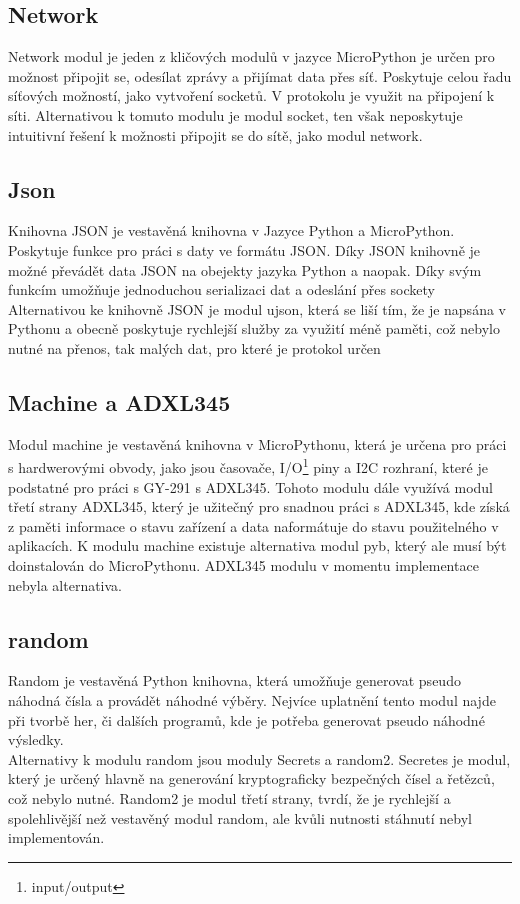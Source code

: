 \documentclass[12pt]{report}			%
\begin{document}
\subsection{Network}
Network modul je jeden z kličových modulů v jazyce MicroPython je určen pro možnost připojit se, odesílat zprávy a přijímat data přes síť. Poskytuje celou řadu síťových možností, jako vytvoření socketů. V protokolu je využit na připojení k síti. Alternativou k tomuto modulu je modul socket, ten však neposkytuje intuitivní řešení k možnosti připojit se do sítě, jako modul network. 

\subsection{Json}
Knihovna JSON je vestavěná knihovna v Jazyce Python a MicroPython. Poskytuje funkce pro práci s daty ve formátu JSON. Díky JSON knihovně je možné převádět data JSON na obejekty jazyka Python a naopak. Díky svým funkcím umožňuje jednoduchou serializaci dat a odeslání přes sockety 
\\
Alternativou ke knihovně JSON je modul ujson, která se liší tím, že je napsána v Pythonu a obecně poskytuje rychlejší služby za využití méně paměti, což nebylo nutné na přenos, tak malých dat, pro které je protokol určen 

\subsection{Machine a ADXL345}
Modul machine je vestavěná knihovna v MicroPythonu, která je určena pro práci s hardwerovými obvody, jako jsou časovače, I/O\footnote{input/output} piny a I2C rozhraní, které je podstatné pro práci s GY-291 s ADXL345. Tohoto modulu dále využívá modul třetí strany ADXL345, který je užitečný pro snadnou práci s ADXL345, kde získá z paměti informace o stavu zařízení a data naformátuje do stavu použitelného v aplikacích. K modulu machine existuje alternativa modul pyb, který ale musí být doinstalován do MicroPythonu. ADXL345 modulu v momentu implementace nebyla alternativa. 

\subsection{random}
Random je vestavěná Python knihovna, která umožňuje generovat pseudo náhodná čísla a provádět náhodné výběry. Nejvíce uplatnění tento modul najde při tvorbě her, či dalších programů, kde je potřeba generovat pseudo náhodné výsledky. 
\\
Alternativy k modulu random jsou moduly Secrets a random2. Secretes je modul, který je určený hlavně na generování kryptograficky bezpečných čísel a řetězců, což nebylo nutné. Random2 je modul třetí strany, tvrdí, že je rychlejší a spolehlivější než vestavěný modul random, ale kvůli nutnosti stáhnutí nebyl implementován.
\end{document}
